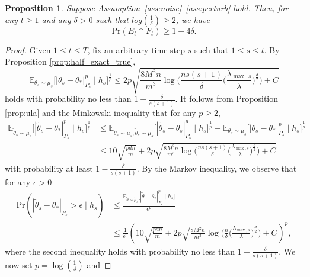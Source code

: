 \documentclass[11pt]{article}
\theoremstyle{plain}
\newtheorem{prop}[thm]{Proposition}
\theoremstyle{definition}
\theoremstyle{remark}
\begin{document}
\begin{prop}\label{prop:hp}
Suppose Assumption~\ref{ass:noise}--\ref{ass:perturb} hold. Then, for any $t\geq 1$ and any $\delta>0$ such that $log(\frac{1}{\delta})\geq 2$, we have
\[
\mathrm{Pr}( E_t \cap F_t) \geq 1-4\delta.
\]
\end{prop}
\begin{proof}
Given $1\leq t \leq T$, 
fix an arbitrary time step $s$ such that $1 \leq s \leq t$. 
By Proposition \ref{prop:half_exact_true},
\[
\mathbb{E}_{\theta_s \sim \mu_s}\big[
| \theta_s - \theta_* |^p_{P_s} \mid h_{s}
\big ]^{\frac{1}{p}} \leq 2p \sqrt{\frac{8M^2n}{m^3}\log \bigg(\frac{ns(s+1)}{\delta}\bigg(\frac{\lambda_{\max,s}}{\lambda}\bigg)^{\frac{d}{2}}\bigg)+ C}
\]
holds with probability no less than $1-\frac{\delta}{s(s+1)}$.
It follows from Proposition \ref{prop:ula} and the Minkowski inequality that  for any $p \geq 2$,
\begin{equation*}
\begin{split}
    \mathbb{E}_{\tilde \theta_s \sim \tilde \mu_s}\big[
| \tilde\theta_s - \theta_* |^p_{P_s} \mid h_{s}
\big ]^{\frac{1}{p}} & \leq \mathbb{E}_{\theta_s \sim \mu_s, \tilde{\theta}_s \sim \tilde{\mu}_s}\big[
| \tilde\theta_s - \theta_s |^p_{P_s} \mid h_{s}
\big ]^{\frac{1}{p}}+ \mathbb{E}_{\theta_s \sim \mu_s}\big[
| \theta_s - \theta_* |^p_{P_s} \mid h_{s}
\big ]^{\frac{1}{p}}\\
&\leq 10\sqrt{\frac{pdn}{m}}+ 2p \sqrt{\frac{8M^2n}{m^3}\log \bigg(\frac{n s(s+1)}{\delta}\bigg(\frac{\lambda_{\max,s}}{\lambda}\bigg)^{\frac{d}{2}}\bigg)+C}
\end{split}
\end{equation*}
with probability at least  $1-\frac{\delta}{s(s+1)}$.
By the Markov inequality, we observe that for any $\epsilon>0$
\begin{equation*}
\begin{split}
    \mathrm{Pr}(|\tilde{\theta}_s-\theta_*|_{P_s}>\epsilon \mid h_{s}) &\leq \frac{\mathbb{E}_{\tilde \theta \sim \tilde \mu_s}\big[
    | \tilde\theta - \theta_* |^p_{P_s} \mid h_{s}
    \big ]}{\epsilon^p}\\
    &\leq \frac{1}{\epsilon^p}\left(10\sqrt{\frac{pdn}{m}}+ 2p \sqrt{\frac{8M^2n}{m^3}\log \bigg(\frac{n}{\delta}\bigg(\frac{\lambda_{\max,s}}{\lambda}\bigg)^{\frac{d}{2}}\bigg)+ C}\right)^p,
\end{split}
\end{equation*}
where the second inequality holds with probability no less than $1-\frac{\delta}{s(s+1)}$.
We now set $p=\log (\frac{1}{\delta})$ and  


\end{proof}
\end{document}
